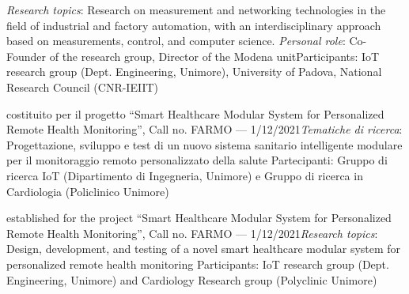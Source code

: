 		{}{\newline \emph{Research topics}: Research on measurement and networking technologies in the field of industrial and factory automation, with an interdisciplinary approach based on measurements, control, and computer science.}
		{\newline \emph{Personal role}: Co-Founder of the research group, Director of the Modena unit}{Participants: IoT research group (Dept. Engineering, Unimore), University of Padova, National Research Council (CNR-IEIIT)}
		{}%

	{\newline costituito per il progetto ``Smart Healthcare Modular System for Personalized Remote Health Monitoring'', Call no. FARMO --- 1/12/2021\newline \emph{Tematiche di ricerca}: Progettazione, sviluppo e test di un nuovo sistema sanitario intelligente modulare per il monitoraggio remoto personalizzato della salute}
	{\newline Partecipanti: Gruppo di ricerca IoT (Dipartimento di Ingegneria, Unimore) e Gruppo di ricerca in Cardiologia (Policlinico Unimore)}{}
	{}



	{\newline established for the project ``Smart Healthcare Modular System for Personalized Remote Health Monitoring'', Call no. FARMO --- 1/12/2021\newline \emph{Research topics}: Design, development, and testing of a novel smart healthcare modular system for personalized remote health monitoring}
	{\newline Participants: IoT research group (Dept. Engineering, Unimore) and Cardiology Research group (Polyclinic Unimore)}{}
	{}


